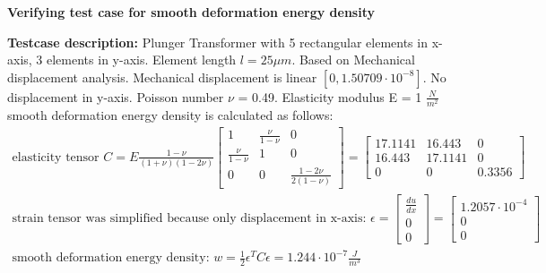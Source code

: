 \documentclass[12pt,a4paper]{article}
\begin{document}
\pagestyle{empty}
\hspace*{-0.8cm}

\noindent


\onehalfspacing
{}
\setlength{\parindent}{0em} 


\pagestyle{fancy}
\fancyhf{}
\fancyfoot[C]{\slshape \thepage}
\renewcommand{\sectionmark}[1]{\markboth{#1}{}}
\renewcommand{\headrulewidth}{0.0pt}
\renewcommand{\footrulewidth}{0.0pt}


\pagestyle{fancy}

%
%
%


\begin{center}
    \textbf{Verifying test case for smooth deformation energy density}
\end{center}

\textbf{Testcase description:} Plunger Transformer with 5 rectangular elements in x-axis, 3 elements in y-axis. Element length $l=25 \mu m$. Based on Mechanical displacement analysis. Mechanical displacement is linear $[0, 1.50709\cdot 10^{-8}]$. No displacement in y-axis. Poisson number $\nu$ = 0.49. Elasticity modulus E = 1 $\frac{N}{m^2}$\\
smooth deformation energy density is calculated as follows:
\begin{align}
    \text{elasticity tensor } C = E \frac{1-\nu}{(1+\nu)(1-2\nu)}\begin{bmatrix}
        1&\frac{\nu}{1-\nu}&0\\ \frac{\nu}{1-\nu}&1&0\\ 0& 0&\frac{1-2\nu}{2(1-\nu)}
    \end{bmatrix} = \begin{bmatrix}
        17.1141&16.443&0\\16.443&17.1141&0\\0&0&0.3356
    \end{bmatrix} \nonumber\\
    \text{strain tensor was simplified because only displacement in x-axis: }\epsilon = \begin{bmatrix}
        \frac{du}{dx} \\ 0 \\ 0
    \end{bmatrix} = \begin{bmatrix}
        1.2057\cdot10^{-4} \\ 0\\ 0
    \end{bmatrix} \nonumber \\
    \text{smooth deformation energy density: }w = \frac{1}{2} \epsilon^TC\epsilon = 1.244\cdot10^{-7} \frac{J}{m^3} \nonumber
\end{align}
\end{document}

